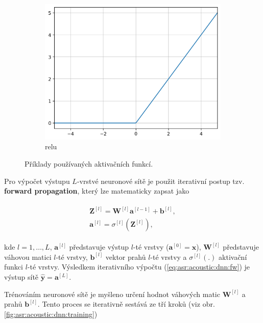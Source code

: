 \begin{figure}[htpb]
\begin{subfigure}[b]{0.28\textwidth}
    \includegraphics[width=\textwidth]{./parts/ch4-asr/img/relu.png}
    \caption{relu}
    \label{fig:asr:acoustic:dnn:activation:relu}
  \end{subfigure}
  \caption{Příklady používaných aktivačních funkcí.}
  \label{fig:asr:acoustic:dnn:activation}
\end{figure}

\newpage Pro výpočet výstupu $L$-vrstvé neuronové sítě je použit iterativní postup tzv. \textbf{forward propagation}, který lze matematicky zapsat jako

\begin{align}
  \begin{split}
    \mathbf{Z}^{[l]} = \mathbf{W}^{[l]}\mathbf{a}^{[l-1]} + \mathbf{b}^{[l]}, \\
    \mathbf{a}^{[l]} = \sigma^{[l]}\left(\mathbf{Z}^{[l]}\right),
  \end{split}
  \label{eq:asr:acoustic:dnn:fw}
\end{align}

\noindent kde $l = 1, \dots, L$, $\boldsymbol{a}^{[l]}$ představuje výstup $l$-té vrstvy ($\boldsymbol{a}^{[0]} = \boldsymbol{x}$), $\mathbf{W}^{[l]}$ představuje váhovou matici $l$-té vrstvy, $\mathbf{b}^{[l]}$ vektor prahů $l$-té vrstvy a $\sigma^{[l]}(.)$ aktivační funkci $l$-té vrstvy. Výsledkem iterativního výpočtu (\ref{eq:asr:acoustic:dnn:fw}) je výstup sítě $\hat{\boldsymbol{y}} = \boldsymbol{a}^{[L]}$.

Trénováním neuronové sítě je myšleno určení hodnot váhových matic $\mathbf{W}^{[l]}$ a prahů $\mathbf{b}^{[l]}$. Tento proces se iterativně sestává ze tří kroků (viz obr. \ref{fig:asr:acoustic:dnn:training})

